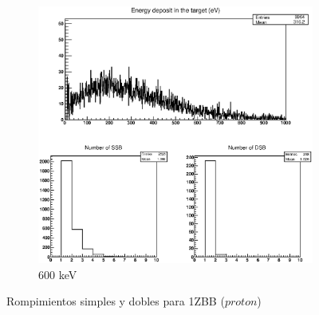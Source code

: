 \begin{figure}
\begin{subfigure}{.5\textwidth}
  \includegraphics[width=.78\linewidth]{./Figures/1zbbp600kev.eps}
  \caption{600 keV}
  \label{fig:sub8}
\end{subfigure}
\caption{Rompimientos simples y dobles para 1ZBB ($proton$)}
\label{fig:p}
\end{figure}



